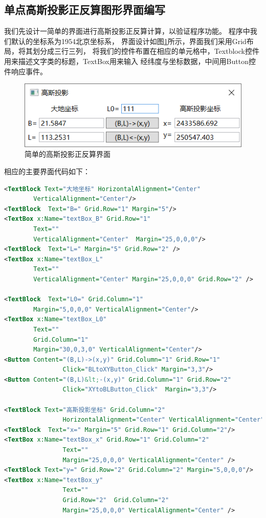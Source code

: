 \subsection{单点高斯投影正反算图形界面编写}
我们先设计一简单的界面进行高斯投影正反算计算，以验证程序功能。
程序中我们默认的坐标系为1954北京坐标系，
界面设计如图\ref{fig:GaussProjUI01}所示，界面我们采用Grid布局，将其划分成三行三列，
将我们的控件布置在相应的单元格中，Textblock控件用来描述文字类的标题，TextBox用来输入
经纬度与坐标数据，中间用Button控件响应事件。

\begin{figure}[htbp]
    \centering
    \includegraphics[scale=1]{gaussProj/UI01.png}
    \caption{简单的高斯投影正反算界面}
    \label{fig:GaussProjUI01}
\end{figure}

相应的主要界面代码如下：

\begin{lstlisting}[language=xml]
<TextBlock Text="大地坐标" HorizontalAlignment="Center"
        VerticalAlignment="Center"/>
<TextBlock  Text="B=" Grid.Row="1" Margin="5"/>
<TextBox x:Name="textBox_B" Grid.Row="1"
        Text=""
        VerticalAlignment="Center"  Margin="25,0,0,0"/>
<TextBlock  Text="L=" Margin="5" Grid.Row="2" />
<TextBox x:Name="textBox_L"
        Text=""
        VerticalAlignment="Center" Margin="25,0,0,0" Grid.Row="2" />

<TextBlock  Text="L0=" Grid.Column="1"
        Margin="5,0,0,0" VerticalAlignment="Center"/>
<TextBox x:Name="textBox_L0"
        Text=""
        Grid.Column="1"
        Margin="30,0,3,0" VerticalAlignment="Center"/>
<Button Content="(B,L)->(x,y)" Grid.Column="1" Grid.Row="1"
                Click="BLtoXYButton_Click" Margin="3,3"/>
<Button Content="(B,L)&lt;-(x,y)" Grid.Column="1" Grid.Row="2"
                Click="XYtoBLButton_Click"  Margin="3,3"/>
        
<TextBlock Text="高斯投影坐标" Grid.Column="2"
                HorizontalAlignment="Center" VerticalAlignment="Center"/>
<TextBlock  Text="x=" Margin="5" Grid.Row="1" Grid.Column="2"/>
<TextBox x:Name="textBox_x" Grid.Row="1" Grid.Column="2"
                Text=""
                Margin="25,0,0,0" VerticalAlignment="Center" />
<TextBlock Text="y=" Grid.Row="2" Grid.Column="2" Margin="5,0,0,0"/>
<TextBox x:Name="textBox_y"
                Text=""
                Grid.Row="2"  Grid.Column="2"
                Margin="25,0,0,0" VerticalAlignment="Center" />       
\end{lstlisting}

